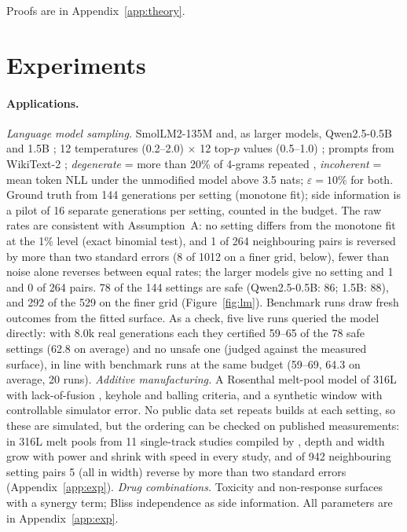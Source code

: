 \documentclass{article}
\newcommand{\eps}{\varepsilon}
\begin{document}
Proofs are in Appendix~\ref{app:theory}.

\section{Experiments}\label{sec:exp}

\paragraph{Applications.}
\emph{Language model sampling.} SmolLM2-135M \citep{allal2025smollm2}
and, as larger models, Qwen2.5-0.5B and 1.5B \citep{qwen2024qwen25};
12 temperatures (0.2--2.0) $\times$ 12 top-$p$ values (0.5--1.0)
\citep{holtzman2020curious}; prompts from WikiText-2
\citep{merity2017wikitext}; \emph{degenerate} = more than 20\% of 4-grams
repeated \citep{welleck2020unlikelihood}, \emph{incoherent} = mean token
NLL under the unmodified model above 3.5 nats; $\eps = 10\%$ for both.
Ground truth from 144 generations per setting (monotone fit); side
information is a pilot of 16 separate generations per setting, counted in
the budget. The raw rates are consistent with Assumption~A: no setting
differs from the monotone fit at the 1\% level (exact binomial test), and
1 of 264 neighbouring pairs is reversed by more than two standard errors
(8 of 1012 on a finer grid, below), fewer than noise alone reverses
between equal rates; the larger models give no setting and 1 and 0 of 264
pairs. 78 of the 144 settings are safe (Qwen2.5-0.5B: 86; 1.5B: 88), and 292 of
the 529 on the finer grid (Figure~\ref{fig:lm}). Benchmark runs draw fresh outcomes from the fitted
surface. As a check, five live runs queried the model directly: with 8.0k
real generations each they certified 59--65 of the 78 safe settings (62.8
on average) and no unsafe one (judged against the measured surface), in
line with benchmark runs at the same budget (59--69, 64.3 on average, 20
runs).
\emph{Additive manufacturing.} A Rosenthal melt-pool model
\citep{rosenthal1946} of 316L with lack-of-fusion \citep{tang2017lof},
keyhole \citep{king2014keyhole} and balling criteria, and a synthetic
window with controllable simulator error. No public data set repeats
builds at each setting, so these are simulated, but the ordering can be
checked on published measurements: in 316L melt pools from 11
single-track studies compiled by \citet{akbari2022meltpoolnet}, depth
and width grow with power and shrink with speed in every study, and of
942 neighbouring setting pairs 5 (all in width) reverse by more than two
standard errors (Appendix~\ref{app:exp}).
\emph{Drug combinations.} Toxicity and non-response surfaces with a synergy
term; Bliss independence \citep{bliss1939} as side information. All
parameters are in Appendix~\ref{app:exp}.
\end{document}
